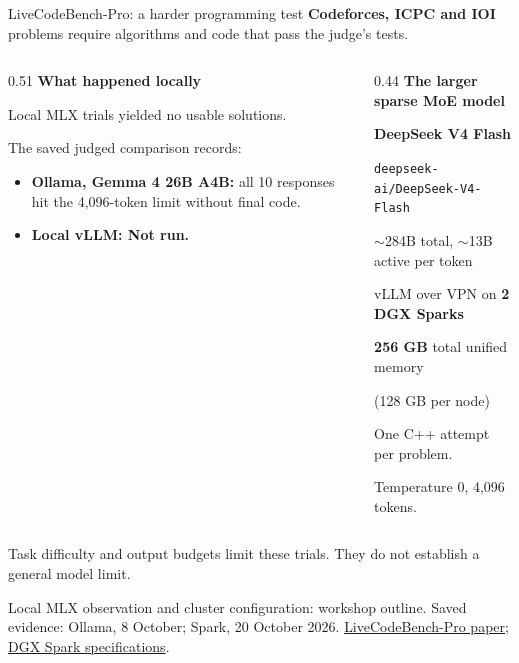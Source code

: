 \documentclass[aspectratio=169,12pt]{beamer}
\newcommand{\source}[1]{\par\vfill{\fontsize{7}{8.5}\selectfont\color{black!65}#1\par}}
\newcommand{\modelid}[1]{{\fontsize{8}{9.5}\selectfont\texttt{#1}}}
\newcommand{\lead}[1]{{\usebeamercolor[fg]{structure}\bfseries #1}}
\begin{document}
\begin{frame}{LiveCodeBench-Pro: a harder programming test}
\small
\textbf{Codeforces, ICPC and IOI} problems require algorithms and code that pass the judge's tests.
\par\medskip

\begin{columns}[T,onlytextwidth]
\begin{column}{0.51\textwidth}
\lead{What happened locally}\par\smallskip
Local MLX trials yielded no usable solutions.\par
The saved judged comparison records:
\begin{itemize}
\setlength{\itemsep}{0.4em}
\item \textbf{Ollama, Gemma 4 26B A4B:} all 10 responses hit the 4,096-token limit
without final code.
\item \textbf{Local vLLM: Not run.}
\end{itemize}
\end{column}
\begin{column}{0.44\textwidth}
\lead{The larger sparse MoE model}\par\smallskip
\textbf{DeepSeek V4 Flash}\par
\modelid{deepseek-ai/DeepSeek-V4-Flash}
\par\smallskip
$\sim$284B total, $\sim$13B active per token
\par\smallskip
vLLM over VPN on \textbf{2 DGX Sparks}\par
\textbf{256 GB} total unified memory\par
(128 GB per node)
\par\smallskip
One C++ attempt per problem.\par
Temperature 0, 4,096 tokens.
\end{column}
\end{columns}
\par\medskip
Task difficulty and output budgets limit these trials. They do not establish a general model limit.
\source{Local MLX observation and cluster configuration: workshop outline.
Saved evidence: Ollama, 8 October; Spark, 20 October 2026.
\href{https://arxiv.org/abs/2506.11928}{LiveCodeBench-Pro paper};
\href{https://www.nvidia.com/en-us/products/workstations/dgx-spark/}{DGX Spark specifications}.}
\end{frame}
\end{document}
